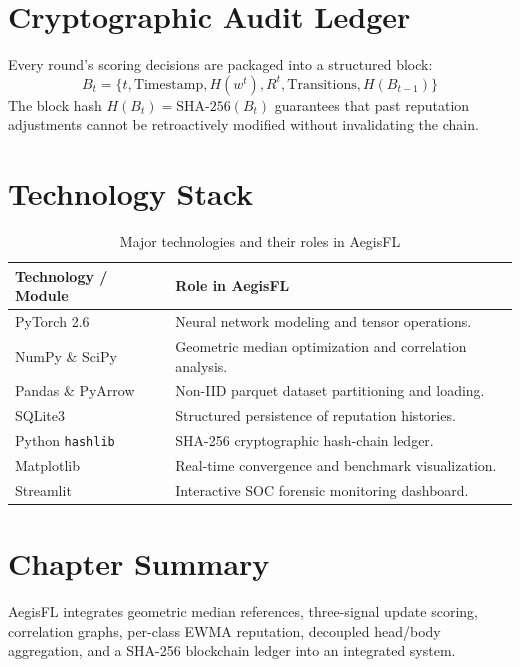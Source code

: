\documentclass[12pt,a4paper]{report}
\begin{document}
\section{Cryptographic Audit Ledger}
Every round's scoring decisions are packaged into a structured block:
\begin{equation}
B_t = \{ t, \text{Timestamp}, H(w^t), R^t, \text{Transitions}, H(B_{t-1}) \}
\end{equation}
The block hash $H(B_t) = \text{SHA-256}(B_t)$ guarantees that past reputation adjustments cannot be retroactively modified without invalidating the chain.

\section{Technology Stack}
\begin{table}[H]
\centering
\caption{Major technologies and their roles in AegisFL}
\label{tab:tech_stack}
\begin{tabularx}{\textwidth}{lX}
\toprule
\textbf{Technology / Module} & \textbf{Role in AegisFL} \\
\midrule
PyTorch 2.6 & Neural network modeling and tensor operations. \\
NumPy \& SciPy & Geometric median optimization and correlation analysis. \\
Pandas \& PyArrow & Non-IID parquet dataset partitioning and loading. \\
SQLite3 & Structured persistence of reputation histories. \\
Python \texttt{hashlib} & SHA-256 cryptographic hash-chain ledger. \\
Matplotlib & Real-time convergence and benchmark visualization. \\
Streamlit & Interactive SOC forensic monitoring dashboard. \\
\bottomrule
\end{tabularx}
\end{table}

\section{Chapter Summary}
AegisFL integrates geometric median references, three-signal update scoring, correlation graphs, per-class EWMA reputation, decoupled head/body aggregation, and a SHA-256 blockchain ledger into an integrated system.

\newpage
\end{document}
